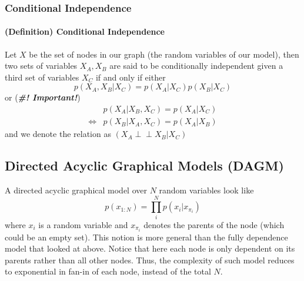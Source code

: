 \documentclass[11pt]{article}
\newcommand{\independent}{\perp \!\!\! \perp}
\begin{document}
\subsubsection{Conditional Independence} 
\paragraph{(Definition) Conditional Independence} Let $X$ be the set of nodes in our graph (the random variables of our model), then two sets of variables $X_A, X_B$ are said to be conditionally independent given a third set of variables $X_C$ if and only if either
\begin{equation*}
    p\left(X_{A}, X_{B} | X_{C}\right)=p\left(X_{A} | X_{C}\right) p\left(X_{B} | X_{C}\right)
\end{equation*}
or (\textit{\textbf{\#! Important!}})
\begin{align*}
    &p\left(X_{A} | X_{B}, X_{C}\right)=p\left(X_{A} | X_{C}\right) \\
    \iff &p\left(X_{B} | X_{A}, X_{C}\right)=p\left(X_{A} | X_{B}\right)
\end{align*}
and we denote the relation as $\left(X_{A} \independent X_{B} | X_{C}\right)$

\subsection{Directed Acyclic Graphical Models (DAGM)}
A directed acyclic graphical model over $N$ random variables look like
\begin{equation*}
    p\left(x_{1:N}\right)=\prod_{i}^{N} p\left(x_{i} | x_{\pi_{i}}\right)
\end{equation*}
where $x_i$ is a random variable and $x_{\pi_i}$ denotes the parents of the node (which could be an empty set). This notion is more general than the fully dependence model that looked at above. Notice that here each node is only dependent on its parents rather than all other nodes. Thus, the complexity of such model reduces to exponential in fan-in of each node, instead of the total $N$. 
\end{document}
